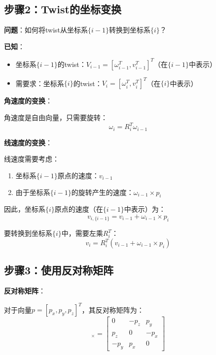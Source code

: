 \documentclass[12pt,a4paper]{article}
\begin{document}
\subsection{步骤2：Twist的坐标变换}

\textbf{问题}：如何将twist从坐标系$\{i-1\}$转换到坐标系$\{i\}$？

\textbf{已知}：
\begin{itemize}
\item 坐标系$\{i-1\}$的twist：$V_{i-1} = [\omega_{i-1}^T, v_{i-1}^T]^T$（在$\{i-1\}$中表示）
\item 需要求：坐标系$\{i\}$的twist：$V_i = [\omega_i^T, v_i^T]^T$（在$\{i\}$中表示）
\end{itemize}

\textbf{角速度的变换}：

角速度是自由向量，只需要旋转：
\begin{equation}
\omega_i = R_i^T \omega_{i-1}
\end{equation}

\textbf{线速度的变换}：

线速度需要考虑：
\begin{enumerate}
\item 坐标系$\{i-1\}$原点的速度：$v_{i-1}$
\item 由于坐标系$\{i-1\}$的旋转产生的速度：$\omega_{i-1} \times p_i$
\end{enumerate}

因此，坐标系$\{i\}$原点的速度（在$\{i-1\}$中表示）为：
\begin{equation}
v_{i,\{i-1\}} = v_{i-1} + \omega_{i-1} \times p_i
\end{equation}

要转换到坐标系$\{i\}$中，需要左乘$R_i^T$：
\begin{equation}
v_i = R_i^T (v_{i-1} + \omega_{i-1} \times p_i)
\end{equation}

\subsection{步骤3：使用反对称矩阵}

\textbf{反对称矩阵}：

对于向量$p = [p_x, p_y, p_z]^T$，其反对称矩阵为：
\begin{equation}
[p]_{\times} = \begin{bmatrix}
0 & -p_z & p_y \\
p_z & 0 & -p_x \\
-p_y & p_x & 0
\end{bmatrix}
\end{equation}
\end{document}
